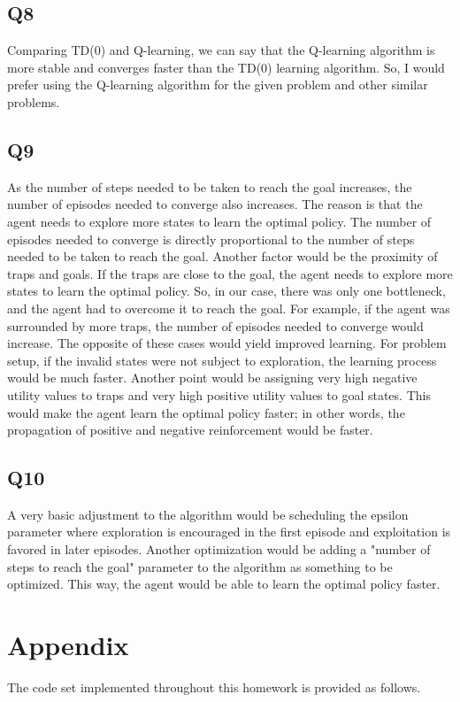 \documentclass{assignment}
\begin{document}
\subsection{Q8}
Comparing TD(0) and Q-learning, we can say that the Q-learning algorithm is more stable and converges faster than the TD(0) learning algorithm. So, I would prefer using the Q-learning algorithm for the given problem and other similar problems.  

\subsection{Q9}
As the number of steps needed to be taken to reach the goal increases, the number of episodes needed to converge also increases. The reason is that the agent needs to explore more states to learn the optimal policy. The number of episodes needed to converge is directly proportional to the number of steps needed to be taken to reach the goal. Another factor would be the proximity of traps and goals. If the traps are close to the goal, the agent needs to explore more states to learn the optimal policy. So, in our case, there was only one bottleneck, and the agent had to overcome it to reach the goal. For example, if the agent was surrounded by more traps, the number of episodes needed to converge would increase. The opposite of these cases would yield improved learning. For problem setup, if the invalid states were not subject to exploration, the learning process would be much faster. Another point would be assigning very high negative utility values to traps and very high positive utility values to goal states. This would make the agent learn the optimal policy faster; in other words, the propagation of positive and negative reinforcement would be faster.

\subsection{Q10}

A very basic adjustment to the algorithm would be scheduling the epsilon parameter where exploration is encouraged in the first episode and exploitation is favored in later episodes. Another optimization would be adding a "number of steps to reach the goal" parameter to the algorithm as something to be optimized. This way, the agent would be able to learn the optimal policy faster. 

\section*{Appendix}
The code set implemented throughout this homework is provided as follows. 





\nocite{*} 
\end{document}
